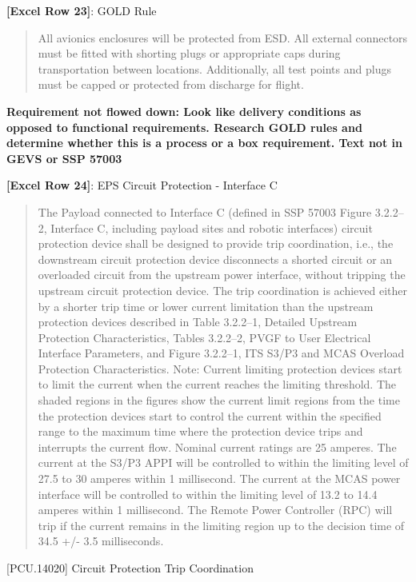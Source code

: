 \textbf{[Excel Row 23]}: GOLD Rule

\begin{quote}
All avionics enclosures will be protected from ESD. All external connectors must be fitted with shorting plugs or appropriate caps during transportation between locations. Additionally, all test points and plugs must be capped or protected from discharge for flight.
\end{quote}

\textbf{Requirement not flowed down: Look like delivery conditions as opposed to functional requirements. Research GOLD rules and determine whether this is a process or a box requirement. Text not in GEVS or SSP 57003}

\textbf{[Excel Row 24]}: EPS Circuit Protection - Interface C

\begin{quote}
The Payload connected to Interface C (defined in SSP 57003 Figure 3.2.2--2, Interface C, including payload sites and robotic interfaces) circuit protection device shall be designed to provide trip coordination, i.e., the downstream circuit protection device disconnects a shorted circuit or an overloaded circuit from the upstream power interface, without tripping the upstream circuit protection device. The trip coordination is achieved either by a shorter trip time or lower current limitation than the upstream protection devices described in Table 3.2.2--1, Detailed Upstream Protection Characteristics, Tables 3.2.2--2, PVGF to User Electrical Interface Parameters, and Figure 3.2.2--1, ITS S3\slash P3 and MCAS Overload Protection Characteristics.
Note: Current limiting protection devices start to limit the current when the current reaches the limiting threshold. The shaded regions in the figures show the current limit regions from the time the protection devices start to control the current within the specified range to the maximum time where the protection device trips and interrupts the current flow. Nominal current ratings are 25 amperes. The current at the S3\slash P3 APPI will be controlled to within the limiting level of 27.5 to 30 amperes within 1 millisecond. The current at the MCAS power interface will be controlled to within the limiting level of 13.2 to 14.4 amperes within 1 millisecond. The Remote Power Controller (RPC) will trip if the current remains in the limiting region up to the decision time of 34.5 +\slash - 3.5 milliseconds.
\end{quote}

[PCU.14020] Circuit Protection Trip Coordination

